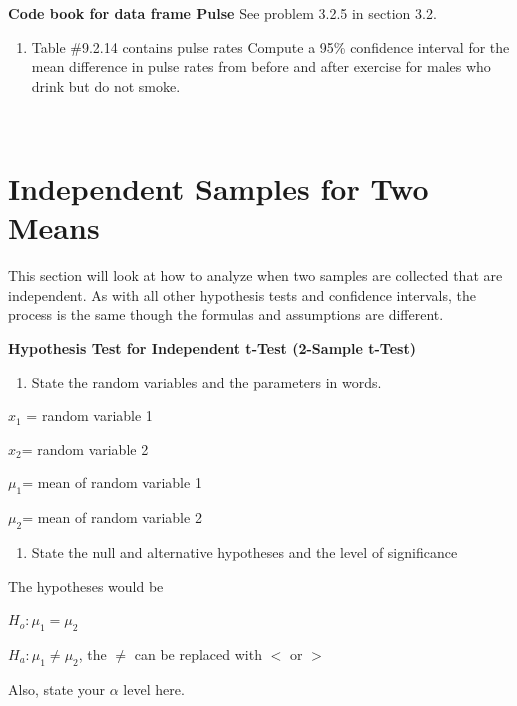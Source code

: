 \documentclass[]{book}
\providecommand{\tightlist}{%
  \setlength{\itemsep}{0pt}\setlength{\parskip}{0pt}}
\begin{document}
\textbf{Code book for data frame Pulse} See problem 3.2.5 in section 3.2.

\begin{enumerate}
\def\labelenumi{\arabic{enumi}.}
\setcounter{enumi}{11}
\tightlist
\item
  Table \#9.2.14 contains pulse rates Compute a 95\% confidence interval for the mean difference in pulse rates from before and after exercise for males who drink but do not smoke.
\end{enumerate}

\textbf{\\
}

\hypertarget{independent-samples-for-two-means}{%
\section{Independent Samples for Two Means}\label{independent-samples-for-two-means}}

This section will look at how to analyze when two samples are collected that are independent. As with all other hypothesis tests and confidence intervals, the process is the same though the formulas and assumptions are different.

\textbf{Hypothesis Test for Independent t-Test (2-Sample t-Test)}

\begin{enumerate}
\def\labelenumi{\arabic{enumi}.}
\tightlist
\item
  State the random variables and the parameters in words.
\end{enumerate}

\(x_1\) = random variable 1

\(x_2\)= random variable 2

\(\mu_1\)= mean of random variable 1

\(\mu_2\)= mean of random variable 2

\begin{enumerate}
\def\labelenumi{\arabic{enumi}.}
\setcounter{enumi}{1}
\tightlist
\item
  State the null and alternative hypotheses and the level of significance
\end{enumerate}

The hypotheses would be

\(H_o:\mu_1=\mu_2\)

\(H_a:\mu_1\ne \mu_2\), the \(\ne\) can be replaced with \(<\) or \(>\)

Also, state your \(\alpha\) level here.
\end{document}
